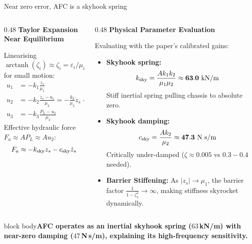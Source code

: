 \documentclass[aspectratio=169,10pt]{beamer}
\newcommand{\takeaway}[1]{\vfill\begin{beamercolorbox}[wd=\linewidth,sep=1ex]{block body}\color{accent}\bfseries #1\end{beamercolorbox}}
\begin{document}
\begin{frame}{Near zero error, AFC is a skyhook spring}
\begin{columns}[T]
\begin{column}{0.48\linewidth}
\footnotesize
{\color{accent}\bfseries Taylor Expansion Near Equilibrium}
\par\vspace{0.05cm}
Linearising $\operatorname{arctanh}(\zeta_i) \approx \zeta_i = \varepsilon_i/\mu_i$ for small motion:
\begin{align*}
u_1 &= -k_1 \tfrac{z_s}{\mu_1} \\
u_2 &= -k_2 \tfrac{\dot{z}_s - u_1}{\mu_2} = -\tfrac{k_2}{\mu_2}\dot{z}_s - \tfrac{k_1 k_2}{\mu_1 \mu_2} z_s \\
u_3 &= -k_3 \tfrac{P_L - u_2}{\mu_3}
\end{align*}
Effective hydraulic force $F_a \approx A P_L \approx A u_2$:
\[ F_a \approx -k_{\rm sky} z_s - c_{\rm sky} \dot{z}_s \]
\end{column}
\begin{column}{0.48\linewidth}
\footnotesize
{\color{accent}\bfseries Physical Parameter Evaluation}
\par\vspace{0.05cm}
Evaluating with the paper's calibrated gains:
\begin{itemize}\itemsep1.5pt
\item \textbf{Skyhook spring:}
\[ k_{\rm sky} = \frac{A k_1 k_2}{\mu_1 \mu_2} \approx \mathbf{63.0\text{ kN/m}} \]
Stiff inertial spring pulling chassis to absolute zero.
\item \textbf{Skyhook damping:}
\[ c_{\rm sky} = \frac{A k_2}{\mu_2} \approx \mathbf{47.3\text{ N s/m}} \]
Critically under-damped ($\zeta \approx 0.005$ vs $0.3-0.4$ needed).
\item \textbf{Barrier Stiffening:} As $|z_s| \to \mu_1$, the barrier factor $\frac{1}{1-\zeta_1^2} \to \infty$, making stiffness skyrocket dynamically.
\end{itemize}
\end{column}
\end{columns}
\par\vspace{0.1cm}
\takeaway{AFC operates as an inertial skyhook spring ($63\,$kN/m) with near-zero damping ($47\,$N\,s/m), explaining its high-frequency sensitivity.}
\end{frame}
\end{document}
